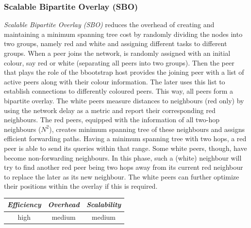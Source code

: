 \subsubsection{Scalable Bipartite Overlay (SBO)}
\emph{Scalable Bipartite Overlay (SBO)}
\cite{LXN2004,LXN2007} reduces the overhead of creating
and maintaining a minimum spanning tree cost by randomly dividing the nodes into
two groups, namely red and white and assigning different tasks to different
groups. When a peer joins the network, is randomly assigned with an initial
colour, say red or white (separating all peers into two groups). Then the peer
that plays the role of the bbootstrap host provides the joining peer with a list
of active peers along with their colour information. The later uses this list to
establish connections to differently coloured peers. This way, all peers form a
bipartite overlay. The white peers measure distances to neighbours (red only) by
using the network delay as a metric and report their corresponding red
neighbours. The red peers, equipped with the information of all two-hop
neighbours ($N^2$), creates minimum spanning tree of these neighbours and
assigns efficient forwarding paths. Having a minimum spanning tree with two
hops, a red peer is able to send its queries within that range. Some white
peers, though, have become non-forwarding neighbours. In this phase, such a
(white) neighbour will try to find another red peer being two hops away from its
current red neighbour to replace the later as its new neighbour. The white peers
can further optimize their positions within the overlay if this is required.

%
%
%

\begin{center}
\begin{tabular}{ccc}
\emph{Efficiency} & \emph{Overhead} & \emph{Scalability} \\
\hline
high &
medium &
%
medium
\end{tabular}
\end{center}

